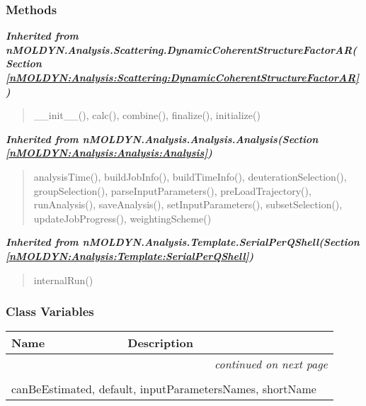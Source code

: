
  \subsubsection{Methods}


\large{\textbf{\textit{Inherited from nMOLDYN.Analysis.Scattering.DynamicCoherentStructureFactorAR\textit{(Section \ref{nMOLDYN:Analysis:Scattering:DynamicCoherentStructureFactorAR})}}}}

\begin{quote}
\_\_init\_\_(), calc(), combine(), finalize(), initialize()
\end{quote}

\large{\textbf{\textit{Inherited from nMOLDYN.Analysis.Analysis.Analysis\textit{(Section \ref{nMOLDYN:Analysis:Analysis:Analysis})}}}}

\begin{quote}
analysisTime(), buildJobInfo(), buildTimeInfo(), deuterationSelection(), groupSelection(), parseInputParameters(), preLoadTrajectory(), runAnalysis(), saveAnalysis(), setInputParameters(), subsetSelection(), updateJobProgress(), weightingScheme()
\end{quote}

\large{\textbf{\textit{Inherited from nMOLDYN.Analysis.Template.SerialPerQShell\textit{(Section \ref{nMOLDYN:Analysis:Template:SerialPerQShell})}}}}

\begin{quote}
internalRun()
\end{quote}


  \subsubsection{Class Variables}

    \vspace{-1cm}
\hspace{\varindent}\begin{longtable}{|p{\varnamewidth}|p{\vardescrwidth}|l}
\cline{1-2}
\cline{1-2} \centering \textbf{Name} & \centering \textbf{Description}& \\
\cline{1-2}
\endhead\cline{1-2}\multicolumn{3}{r}{\small\textit{continued on next page}}\\\endfoot\cline{1-2}
\endlastfoot\multicolumn{2}{|l|}{\textit{Inherited from nMOLDYN.Analysis.Scattering.DynamicCoherentStructureFactorAR \textit{(Section \ref{nMOLDYN:Analysis:Scattering:DynamicCoherentStructureFactorAR})}}}\\
\multicolumn{2}{|p{\varwidth}|}{\raggedright canBeEstimated, default, inputParametersNames, shortName}\\
\cline{1-2}
\end{longtable}


